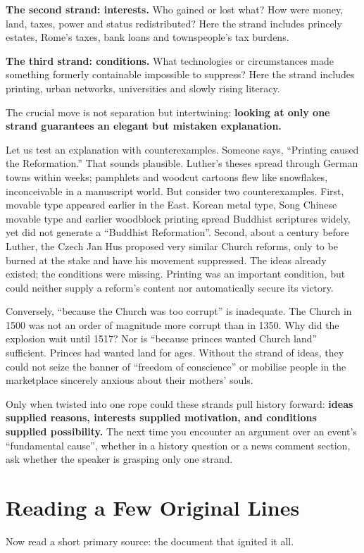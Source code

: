 \textbf{The second strand: interests.} Who gained or lost what? How were money, land, taxes, power and status redistributed? Here the strand includes princely estates, Rome's taxes, bank loans and townspeople's tax burdens.

\textbf{The third strand: conditions.} What technologies or circumstances made something formerly containable impossible to suppress? Here the strand includes printing, urban networks, universities and slowly rising literacy.

The crucial move is not separation but intertwining: \textbf{looking at only one strand guarantees an elegant but mistaken explanation.}

Let us test an explanation with counterexamples. Someone says, ``Printing caused the Reformation.'' That sounds plausible. Luther's theses spread through German towns within weeks; pamphlets and woodcut cartoons flew like snowflakes, inconceivable in a manuscript world. But consider two counterexamples. First, movable type appeared earlier in the East. Korean metal type, Song Chinese movable type and earlier woodblock printing spread Buddhist scriptures widely, yet did not generate a ``Buddhist Reformation''. Second, about a century before Luther, the Czech Jan Hus proposed very similar Church reforms, only to be burned at the stake and have his movement suppressed. The ideas already existed; the conditions were missing. Printing was an important condition, but could neither supply a reform's content nor automatically secure its victory.

Conversely, ``because the Church was too corrupt'' is inadequate. The Church in 1500 was not an order of magnitude more corrupt than in 1350. Why did the explosion wait until 1517? Nor is ``because princes wanted Church land'' sufficient. Princes had wanted land for ages. Without the strand of ideas, they could not seize the banner of ``freedom of conscience'' or mobilise people in the marketplace sincerely anxious about their mothers' souls.

Only when twisted into one rope could these strands pull history forward: \textbf{ideas supplied reasons, interests supplied motivation, and conditions supplied possibility.} The next time you encounter an argument over an event's ``fundamental cause'', whether in a history question or a news comment section, ask whether the speaker is grasping only one strand.

\section{Reading a Few Original Lines}
Now read a short primary source: the document that ignited it all.


